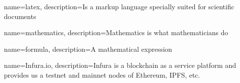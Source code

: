  {
	name=latex,
	description={Is a markup language specially suited for scientific documents}
}

 {
	name=mathematics,
	description={Mathematics is what mathematicians do}
}

 {
	name=formula,
	description={A mathematical expression}
}

 {
	name=Infura.io,
	description={Infura is a blockchain as a service platform and provides us a testnet and mainnet nodes of Ethereum, IPFS, etc.}
}
